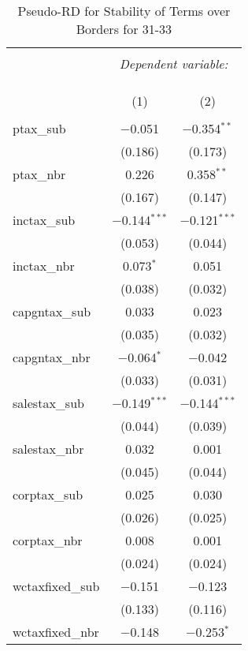 
\begin{table}[!htbp] \centering 
  \caption{Pseudo-RD for Stability of Terms over Borders for  31-33} 
  \label{} 
\begin{tabular}{@{\extracolsep{5pt}}lcc} 
\\[-1.8ex]\hline 
\hline \\[-1.8ex] 
 & \multicolumn{2}{c}{\textit{Dependent variable:}} \\ 
\cline{2-3} 
\\[-1.8ex] & \multicolumn{2}{c}{ } \\ 
\\[-1.8ex] & (1) & (2)\\ 
\hline \\[-1.8ex] 
 ptax\_sub & $-$0.051 & $-$0.354$^{**}$ \\ 
  & (0.186) & (0.173) \\ 
  ptax\_nbr & 0.226 & 0.358$^{**}$ \\ 
  & (0.167) & (0.147) \\ 
  inctax\_sub & $-$0.144$^{***}$ & $-$0.121$^{***}$ \\ 
  & (0.053) & (0.044) \\ 
  inctax\_nbr & 0.073$^{*}$ & 0.051 \\ 
  & (0.038) & (0.032) \\ 
  capgntax\_sub & 0.033 & 0.023 \\ 
  & (0.035) & (0.032) \\ 
  capgntax\_nbr & $-$0.064$^{*}$ & $-$0.042 \\ 
  & (0.033) & (0.031) \\ 
  salestax\_sub & $-$0.149$^{***}$ & $-$0.144$^{***}$ \\ 
  & (0.044) & (0.039) \\ 
  salestax\_nbr & 0.032 & 0.001 \\ 
  & (0.045) & (0.044) \\ 
  corptax\_sub & 0.025 & 0.030 \\ 
  & (0.026) & (0.025) \\ 
  corptax\_nbr & 0.008 & 0.001 \\ 
  & (0.024) & (0.024) \\ 
  wctaxfixed\_sub & $-$0.151 & $-$0.123 \\ 
  & (0.133) & (0.116) \\ 
  wctaxfixed\_nbr & $-$0.148 & $-$0.253$^{*}$ \\ 

\end{tabular}
\end{table}

